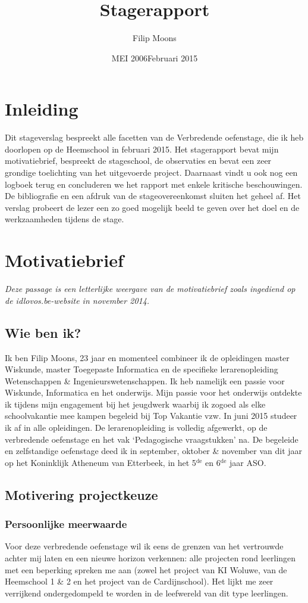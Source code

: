 \documentclass[a4paper,11pt]{article}
\author{Filip Moons}
\title{Stagerapport}
\date{MEI 2006}
\date{Februari 2015}
\theoremstyle{definition}
\begin{document}
\maketitlepage


\tableofcontents
\newpage
\section{Inleiding}
Dit stageverslag bespreekt alle facetten van de Verbredende oefenstage, die ik heb doorlopen op de Heemschool in februari 2015. 
Het stagerapport bevat mijn motivatiebrief, bespreekt de stageschool, de observaties en bevat een zeer grondige toelichting van het uitgevoerde project. 
Daarnaast vindt u ook nog een logboek terug en concluderen we het rapport met enkele kritische beschouwingen. De bibliografie en een afdruk
van de stageovereenkomst sluiten het geheel af. Het verslag 
probeert de lezer een zo goed mogelijk beeld te geven over het doel en de 
werkzaamheden tijdens de stage.
\newpage
\section{Motivatiebrief}
\emph{Deze passage is een letterlijke weergave van de motivatiebrief zoals ingediend op de idlovos.be-website in november 2014.}
\subsection{Wie ben ik?}
Ik ben Filip Moons, 23 jaar en momenteel combineer ik de opleidingen master Wiskunde, master Toegepaste Informatica
en de specifieke lerarenopleiding Wetenschappen \& Ingenieurswetenschappen. Ik heb namelijk een passie voor
Wiskunde, Informatica en het onderwijs. Mijn passie voor het onderwijs ontdekte ik tijdens mijn engagement bij het jeugdwerk waarbij ik zogoed als
elke schoolvakantie mee  kampen begeleid bij Top Vakantie vzw. In juni 2015 studeer ik af in alle opleidingen. De lerarenopleiding is volledig 
afgewerkt, op de verbredende oefenstage en het vak `Pedagogische vraagstukken' 
na. De begeleide en zelfstandige oefenstage deed ik in september, oktober \& 
november van dit jaar op het Koninklijk Atheneum van Etterbeek, in het 5$^\text{de}$ en 6$^\text{de}$ 
jaar ASO.

\subsection{Motivering projectkeuze}
\subsubsection{Persoonlijke meerwaarde}
Voor deze verbredende oefenstage wil ik eens de grenzen van het vertrouwde achter mij laten
en een nieuwe horizon verkennen: alle projecten rond leerlingen met een beperking spreken me aan (zowel het 
project van KI Woluwe, van de Heemschool 1 \& 2 en het project van de Cardijnschool). 
Het lijkt me zeer verrijkend ondergedompeld te worden in de leefwereld van dit type 
leerlingen.\\
\end{document}
